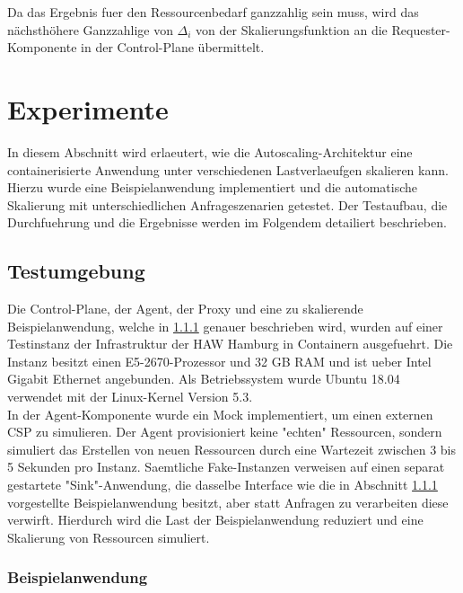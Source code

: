 \documentclass[runningheads]{llncs}
\begin{document}
Da das Ergebnis fuer den Ressourcenbedarf ganzzahlig sein muss, wird das nächsthöhere Ganzzahlige von $\Delta_{i}$ von der Skalierungsfunktion an die Requester-Komponente in der Control-Plane übermittelt.


\section{Experimente}

In diesem Abschnitt wird erlaeutert, wie die Autoscaling-Architektur eine containerisierte Anwendung unter verschiedenen Lastverlaeufgen skalieren kann. Hierzu wurde eine Beispielanwendung implementiert und die automatische Skalierung mit unterschiedlichen Anfrageszenarien getestet. Der Testaufbau, die Durchfuehrung und die Ergebnisse werden im Folgendem detailiert beschrieben.

\subsection{Testumgebung}

Die Control-Plane, der Agent, der Proxy und eine zu skalierende Beispielanwendung, welche in \ref{Beispielanwendung} genauer beschrieben wird, wurden auf einer Testinstanz der Infrastruktur der HAW Hamburg in Containern ausgefuehrt. Die Instanz besitzt einen E5-2670-Prozessor und 32 GB RAM und ist ueber Intel Gigabit Ethernet angebunden. Als Betriebssystem wurde Ubuntu 18.04 verwendet mit der Linux-Kernel Version 5.3. \\

In der Agent-Komponente wurde ein Mock implementiert, um einen externen CSP zu simulieren. Der Agent provisioniert keine "echten" Ressourcen, sondern simuliert das Erstellen von neuen Ressourcen durch eine Wartezeit zwischen 3 bis 5 Sekunden pro Instanz. Saemtliche Fake-Instanzen verweisen auf einen separat gestartete "Sink"-Anwendung, die dasselbe Interface wie die in Abschnitt \ref{Beispielanwendung} vorgestellte Beispielanwendung besitzt, aber statt Anfragen zu verarbeiten diese verwirft. Hierdurch wird die Last der Beispielanwendung reduziert und eine Skalierung von Ressourcen simuliert.

\subsubsection{Beispielanwendung} \label{Beispielanwendung} \hfill\\
\end{document}
